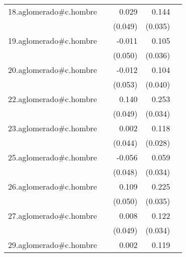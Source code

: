 {\begin{longtable}{l*{4}{D{.}{.}{-1}}}
\addlinespace
18.aglomerado#c.hombre&                     &       0.029         &       0.144\sym{***}&                     \\
            &                     &     (0.049)         &     (0.035)         &                     \\
\addlinespace
19.aglomerado#c.hombre&                     &      -0.011         &       0.105\sym{**} &                     \\
            &                     &     (0.050)         &     (0.036)         &                     \\
\addlinespace
20.aglomerado#c.hombre&                     &      -0.012         &       0.104\sym{**} &                     \\
            &                     &     (0.053)         &     (0.040)         &                     \\
\addlinespace
22.aglomerado#c.hombre&                     &       0.140\sym{**} &       0.253\sym{***}&                     \\
            &                     &     (0.049)         &     (0.034)         &                     \\
\addlinespace
23.aglomerado#c.hombre&                     &       0.002         &       0.118\sym{***}&                     \\
            &                     &     (0.044)         &     (0.028)         &                     \\
\addlinespace
25.aglomerado#c.hombre&                     &      -0.056         &       0.059         &                     \\
            &                     &     (0.048)         &     (0.034)         &                     \\
\addlinespace
26.aglomerado#c.hombre&                     &       0.109\sym{*}  &       0.225\sym{***}&                     \\
            &                     &     (0.050)         &     (0.035)         &                     \\
\addlinespace
27.aglomerado#c.hombre&                     &       0.008         &       0.122\sym{***}&                     \\
            &                     &     (0.049)         &     (0.034)         &                     \\
\addlinespace
29.aglomerado#c.hombre&                     &       0.002         &       0.119\sym{***}&                     \\

\end{longtable}}
